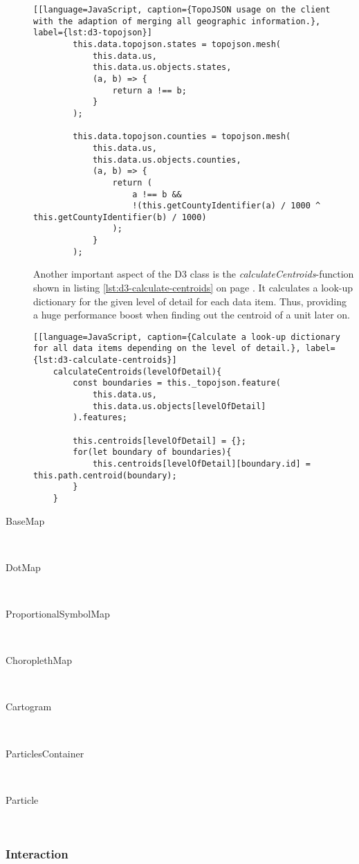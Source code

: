 \begin{description}
\begin{lstlisting}[[language=JavaScript, caption={TopoJSON usage on the client with the adaption of merging all geographic information.}, label={lst:d3-topojson}]
        this.data.topojson.states = topojson.mesh(
            this.data.us,
            this.data.us.objects.states,
            (a, b) => {
                return a !== b;
            }
        );

        this.data.topojson.counties = topojson.mesh(
            this.data.us,
            this.data.us.objects.counties,
            (a, b) => {
                return (
                    a !== b &&
                    !(this.getCountyIdentifier(a) / 1000 ^ this.getCountyIdentifier(b) / 1000)
                );
            }
        );
\end{lstlisting}

Another important aspect of the \ac{D3} class is the \textit{calculateCentroids}-function shown in listing \ref{lst:d3-calculate-centroids} on page \pageref{lst:d3-calculate-centroids}. It calculates a look-up dictionary for the given level of detail for each data item. Thus, providing a huge performance boost when finding out the centroid of a unit later on.

\begin{lstlisting}[[language=JavaScript, caption={Calculate a look-up dictionary for all data items depending on the level of detail.}, label={lst:d3-calculate-centroids}]
    calculateCentroids(levelOfDetail){
        const boundaries = this._topojson.feature(
            this.data.us,
            this.data.us.objects[levelOfDetail]
        ).features;

        this.centroids[levelOfDetail] = {};
        for(let boundary of boundaries){
            this.centroids[levelOfDetail][boundary.id] = this.path.centroid(boundary);
        }
    }
\end{lstlisting}

\item[BaseMap] \hfill \\

\item[DotMap] \hfill \\
\item[ProportionalSymbolMap] \hfill \\
\item[ChoroplethMap] \hfill \\
\item[Cartogram] \hfill \\
\item[ParticlesContainer] \hfill \\
\item[Particle] \hfill \\
\end{description}


\subsubsection{Interaction}
